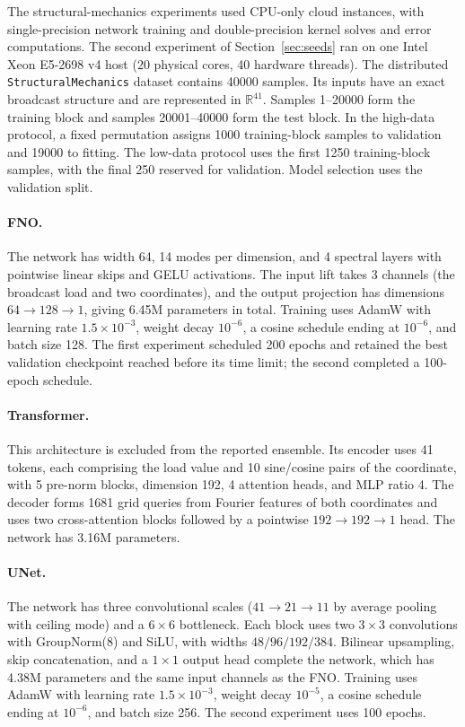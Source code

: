 The structural-mechanics experiments used CPU-only cloud instances,
with single-precision network training and double-precision kernel solves
and error computations. The second experiment of Section~\ref{sec:seeds} ran
on one Intel Xeon E5-2698 v4 host (20 physical cores, 40 hardware threads).
The distributed \texttt{StructuralMechanics} dataset contains 40000
samples. Its inputs have an exact broadcast structure and are represented
in $\mathbb R^{41}$. Samples 1--20000 form the training block and samples
20001--40000 form the test block. In the high-data protocol, a fixed
permutation assigns 1000 training-block samples to validation and 19000
to fitting. The low-data protocol uses the first 1250 training-block
samples, with the final 250 reserved for validation. Model selection uses
the validation split.

\paragraph{FNO.} The network has width 64, 14 modes per dimension, and
4 spectral layers with pointwise linear skips and GELU activations. The
input lift takes 3 channels (the broadcast load and two coordinates), and
the output projection has dimensions $64\to128\to1$, giving 6.45M
parameters in total. Training uses AdamW with learning rate
$1.5\times10^{-3}$, weight decay $10^{-6}$, a cosine schedule ending at
$10^{-6}$, and batch size 128. The first experiment scheduled 200 epochs
and retained the best validation checkpoint reached before its time limit;
the second completed a 100-epoch schedule.

\paragraph{Transformer.} This architecture is excluded from the reported
ensemble. Its encoder uses 41 tokens, each comprising the load value and
10 sine/cosine pairs of the coordinate, with 5 pre-norm blocks, dimension
192, 4 attention heads, and MLP ratio 4. The decoder forms 1681 grid
queries from Fourier features of both coordinates and uses two
cross-attention blocks followed by a pointwise $192\to192\to1$ head.
The network has 3.16M parameters.

\paragraph{UNet.} The network has three convolutional scales
($41\to21\to11$ by average pooling with ceiling mode) and a $6\times6$
bottleneck. Each block uses two $3\times3$ convolutions with GroupNorm(8)
and SiLU, with widths $48/96/192/384$. Bilinear upsampling, skip
concatenation, and a $1\times1$ output head complete the network, which
has 4.38M parameters and the same input channels as the FNO. Training uses
AdamW with learning rate $1.5\times10^{-3}$, weight decay $10^{-5}$, a
cosine schedule ending at $10^{-6}$, and batch size 256. The second
experiment uses 100 epochs.

